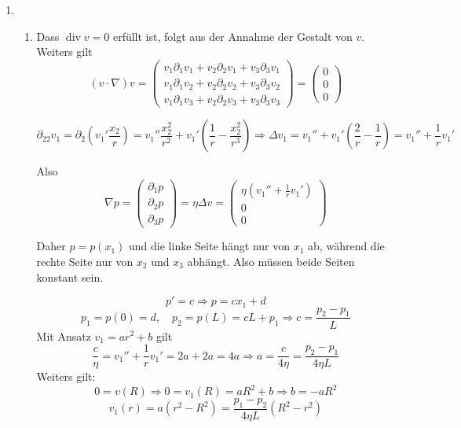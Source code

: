 \documentclass[a4paper,11pt]{scrartcl}
\DeclareMathOperator*{\divop}{div}
\begin{document}
\begin{enumerate}[label*=\textbf{6.\arabic*.}]
  \item
  \begin{enumerate}[label=\textbf{\alph*)}]
    \item
      Dass $\divop{v} = 0$ erfüllt ist, folgt aus der Annahme der Gestalt von $v$.
      Weiters gilt
      \[(v \cdot \nabla) v =
        \begin{pmatrix}
          v_1 \partial_1 v_1 + v_2 \partial_2 v_1 + v_3 \partial_3 v_1\\
          v_1 \partial_1 v_2 + v_2 \partial_2 v_2 + v_3 \partial_3 v_2\\
          v_1 \partial_1 v_3 + v_2 \partial_2 v_3 + v_3 \partial_3 v_3
        \end{pmatrix}
        =
        \begin{pmatrix}0\\0\\0\end{pmatrix}
      \]

      \[\partial_{22} v_1
      = \partial_2\left(v_1'\frac{x_2}{r}\right)
      = v_1'' \frac{x^2_2}{r^2} + v_1' \left( \frac{1}{r} - \frac{x_2^2}{r^3} \right)
    \Rightarrow \Delta v_1 =
    v_1'' + v_1'\left( \frac{2}{r} - \frac{1}{r}\right) = v_1'' + \frac{1}{r} v_1' \]

    Also
    \[ \nabla p =
      \begin{pmatrix}
        \partial_1 p\\\partial_2 p \\\partial_3 p
      \end{pmatrix} =
      \eta \Delta v =
      \begin{pmatrix}\eta (v_1'' + \frac{1}{r} v_1')\\0\\0\end{pmatrix} \]

    Daher $p = p(x_1)$ und die linke Seite hängt nur von $x_1$ ab, während die
    rechte Seite nur von $x_2$ und $x_3$ abhängt. Also müssen beide Seiten
    konstant sein.

    \[p' = c \Rightarrow p = c x_1 + d\]
    \[p_1 = p(0) = d, \quad p_2 = p(L) = c L + p_1 \Rightarrow c = \frac{p_2 - p_1}{L}\]
    Mit Ansatz $v_1 = a r^2 + b$ gilt
    \[\frac{c}{\eta} = v_1'' + \frac{1}{r}v_1' = 2 a + 2 a = 4 a \Rightarrow a
      = \frac{c}{4\eta} = \frac{p_2 - p_1}{4\eta L}\]
    Weiters gilt:
    \[0 = v(R) \Rightarrow 0 = v_1(R) = a R^2 + b \Rightarrow b = - a R^2\]
    \[ v_1(r) = a (r^2 - R^2) = \frac{p_1-p_2}{4\eta L}(R^2 - r^2)\]
    

\end{enumerate}
\end{enumerate}
\end{document}
